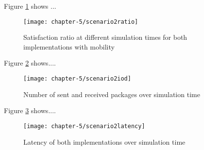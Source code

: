 Figure \ref{fig:scenario2ratio} shows ...

\begin{figure}[H]
  \centering
  \texttt{[image: chapter-5/scenario2ratio]}
  \caption{Satisfaction ratio at different simulation times for both implementations with mobility}
  \label{fig:scenario2ratio}
\end{figure}

Figure \ref{fig:scenario2iod} shows....

\begin{figure}[H]
  \centering
  \texttt{[image: chapter-5/scenario2iod]}
  \caption{Number of sent and received packages over simulation time}
  \label{fig:scenario2iod}
\end{figure}

Figure \ref{fig:scenario2latency} shows....

\begin{figure}[H]
  \centering
  \texttt{[image: chapter-5/scenario2latency]}
  \caption{Latency of both implementations over simulation time}
  \label{fig:scenario2latency}
\end{figure}






